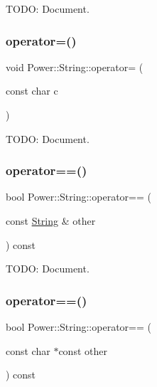 T\+O\+DO\+: Document. 

\mbox{\label{class_power_1_1_string_afca363999008481eb546192d24f8c9c1}} 
\subsubsection{\texorpdfstring{operator=()}{operator=()}\hspace{0.1cm}{\footnotesize\ttfamily [3/3]}}
{\footnotesize\ttfamily void Power\+::\+String\+::operator= (\begin{DoxyParamCaption}\item[{const char}]{c }\end{DoxyParamCaption})\hspace{0.3cm}{\ttfamily [inline]}}



T\+O\+DO\+: Document. 

\mbox{\label{class_power_1_1_string_ae4616e12ee74fcb4f86ffaa15560854b}} 
\subsubsection{\texorpdfstring{operator==()}{operator==()}\hspace{0.1cm}{\footnotesize\ttfamily [1/3]}}
{\footnotesize\ttfamily bool Power\+::\+String\+::operator== (\begin{DoxyParamCaption}\item[{const \hyperlink{class_power_1_1_string}{String} \&}]{other }\end{DoxyParamCaption}) const\hspace{0.3cm}{\ttfamily [inline]}}



T\+O\+DO\+: Document. 

\mbox{\label{class_power_1_1_string_ae357277377a5d612450fcf852ba5bee9}} 
\subsubsection{\texorpdfstring{operator==()}{operator==()}\hspace{0.1cm}{\footnotesize\ttfamily [2/3]}}
{\footnotesize\ttfamily bool Power\+::\+String\+::operator== (\begin{DoxyParamCaption}\item[{const char $\ast$const}]{other }\end{DoxyParamCaption}) const\hspace{0.3cm}{\ttfamily [inline]}}



